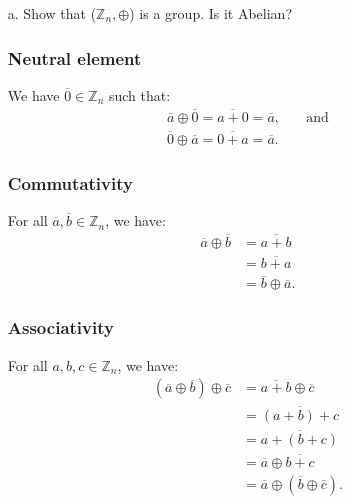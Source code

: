 \documentclass[11pt]{article}
\newcommand{\Z}{\mathbb{Z}}
\newcommand{\cls}[1]{\overline{#1}}                      %
\theoremstyle{definition}
\theoremstyle{plain}
\theoremstyle{remark}
\begin{document}
\begin{enumerate}
    \item[a.] Show that ($\Z_n, \oplus$) is a group. Is it Abelian?

          \subsubsection*{Neutral element}

          We have $\cls{0} \in \Z_n$ such that:
          \[
              \begin{aligned}
                  \cls{a} \oplus \cls{0} = \cls{a + 0} = \cls{a}, & \quad \textrm{and} \\
                  \cls{0} \oplus \cls{a} = \cls{0 + a} = \cls{a}.
              \end{aligned}
          \]

          \subsubsection*{Commutativity}

          For all $\cls{a}, \cls{b} \in \Z_n$, we have:
          \[
              \begin{aligned}
                  \cls{a} \oplus \cls{b} & = \cls{a + b}             \\
                                         & = \cls{b + a}             \\
                                         & = \cls{b} \oplus \cls{a}.
              \end{aligned}
          \]

          \subsubsection*{Associativity}

          For all $a, b, c \in \Z_n$, we have:
          \[
              \begin{aligned}
                  (\cls{a} \oplus \cls{b}) \oplus \cls{c} & = \cls{a + b} \oplus \cls{c}               \\
                                                          & = \cls{(a + b) + c}                        \\
                                                          & = \cls{a + (b + c)}                        \\
                                                          & = \cls{a} \oplus \cls{b + c}               \\
                                                          & = \cls{a} \oplus (\cls{b} \oplus \cls{c}).
              \end{aligned}
          \]


\end{enumerate}
\end{document}
